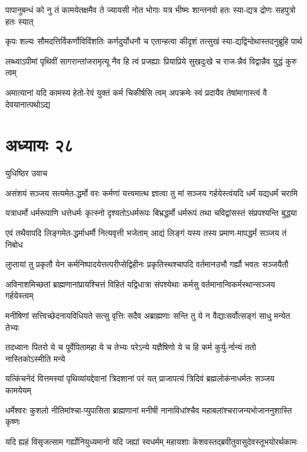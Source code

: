 \twolineshloka
{पापानुबन्धं को नु तं कामयेतक्षमैव ते ज्यायसी नोत भोगाः}
{यत्र भीष्मः शान्तनवो हतः स्या-द्यत्र द्रोणः सहपुत्रो हतः स्यात्}


\twolineshloka
{कृपः शल्यः सौमदत्तिर्विकर्णोविविंशतिः कर्णदुर्योधनौ च}
{एतान्हत्वा कीदृशं तत्सुखं स्या-द्यद्विन्देथास्तदनुब्रूहि पार्थ}


\twolineshloka
{लब्ध्वाऽपीमां पृथिवीं सागरान्तांजरामृत्यू नैव हि त्वं प्रजह्याः}
{प्रियाप्रिये सुखदुःखे च राज-न्नैवं विद्वान्नैव युद्धं कुरु त्वम्}


\twolineshloka
{अमात्यानां यदि कामस्य हेतो-रेवं युक्तं कर्म चिकीर्षसि त्वम्}
{अपक्रमेः स्वं प्रदायैव तेषांमागास्त्वं वै देवयानात्पथोऽद्य}


\chapter{अध्यायः २८}
\twolineshloka
{युधिष्ठिर उवाच}
{}


\twolineshloka
{असंशयं सञ्जय सत्यमेत-द्धर्मो वरः कर्मणां यत्त्वमात्थ}
{ज्ञात्वा तु मां सञ्जय गर्हयेस्त्वंयदि धर्मं यद्यधर्मं चरामि}


\twolineshloka
{यत्राधर्मो धर्मरूपाणि धत्तेधर्मः कृत्स्नो दृश्यतोऽधर्मरूपः}
{बिभ्रद्धर्मो धर्मरूपं तथा चविद्वांसस्तं संप्रपश्यन्ति बुद्ध्या}


\twolineshloka
{एवं तथैवापदि लिङ्गमेत-द्धर्माधर्मौ नित्यवृत्ती भजेताम्}
{आद्यं लिङ्गं यस्य तस्य प्रमाण-मापद्धर्मं सञ्जय तं निबोध}


\twolineshloka
{लुप्तायां तु प्रकृतौ येन कर्मनिष्पादयेत्तत्परीप्सेद्विहीनः}
{प्रकृतिस्थश्चापदि वर्तमानउभौ गर्ह्यौ भवतः सञ्जयैतौ}


\twolineshloka
{अविनाशमिच्छतां ब्राह्मणानांप्रायश्चित्तं विहितं यद्विधात्रा}
{संपश्येथाः कर्मसु वर्तमानान्विकर्मस्थान्सञ्जय गर्हयेस्त्वम्}


\twolineshloka
{मनीषिणां सत्त्विच्छेदनायविधियते सत्सु वृत्तिः सदैव}
{अब्राह्मणाः सन्ति तु ये न वैद्याःसर्वोत्सङ्गं साधु मन्येत तेभ्यः}


\twolineshloka
{तदध्वानः पितरो ये च पूर्वेपितामहा ये च तेभ्यः परेऽन्ये}
{यज्ञैषिणो ये च हि कर्म कुर्यु-र्नान्यं ततो नास्तिकोऽस्मीति मन्ये}


\twolineshloka
{यत्किंचनेदं वित्तमस्यां पृथिव्यांयद्देवानां त्रिदशानां परं यत्}
{प्राजापत्यं त्रिदिवं ब्रह्मलोकंनाधर्मतः सञ्जय कामयेयम्}


\twolineshloka
{धर्मेश्वरः कुशलो नीतिमांश्चा-प्युपासिता ब्राह्मणानां मनीषी}
{नानाविधांश्चैव महाबलांश्चराजन्यभोजाननुशास्ति कृष्णः}


\twolineshloka
{यदि ह्यहं विसृजत्साम गर्ह्योनियुध्यमानो यदि जह्यां स्वधर्मम्}
{महायशाः केशवस्तद्ब्रवीतुवासुदेवस्तूभयोरर्थकामः}



